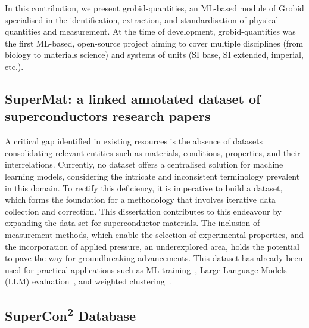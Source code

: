 In this contribution, we present grobid-quantities, an ML-based module of Grobid specialised in the identification, extraction, and standardisation of physical quantities and measurement. At the time of development, grobid-quantities was the first ML-based, open-source project aiming to cover multiple disciplines (from biology to materials science) and systems of units (SI base, SI extended, imperial, etc.). 


\subsection{SuperMat: a linked annotated dataset of superconductors research papers}
A critical gap identified in existing resources is the absence of datasets consolidating relevant entities such as materials, conditions, properties, and their interrelations. 
Currently, no dataset offers a centralised solution for machine learning models, considering the intricate and inconsistent terminology prevalent in this domain. 
To rectify this deficiency, it is imperative to build a dataset, which forms the foundation for a methodology that involves iterative data collection and correction. This dissertation contributes to this endeavour by expanding the data set for superconductor materials. 
The inclusion of measurement methods, which enable the selection of experimental properties, and the incorporation of applied pressure, an underexplored area, holds the potential to pave the way for groundbreaking advancements.
This dataset has already been used for practical applications such as ML training~\cite{foppiano2023automatic}, Large Language Models (LLM) evaluation~\cite{foppiano2024mining}, and weighted clustering~\cite{dieb2022superconductor}. 

\subsection{SuperCon\texorpdfstring{\textsuperscript{2}}{2} Database}

